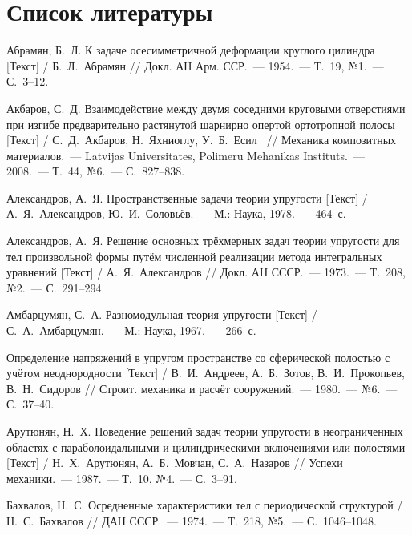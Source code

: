 
\setcounter{secnumdepth}{-1}
\chapter{Список литературы}
\setcounter{secnumdepth}{2}

\renewcommand{\bibliststyle}{\normalsize}
\renewcommand{\bibnumfmt}[1]{#1.\hfill}

\begin{biblist}{99}\setlength\itemsep{-8pt}

Абрамян, Б.~Л. 
К задаче осесимметричной деформации круглого цилиндра [Текст] 
/ Б.~Л.~Абрамян 
// Докл. АН Арм. ССР.~--- 1954.~--- Т.~19, №1.~--- С.~3--12.

Акбаров, С.~Д. 
Взаимодействие между двумя соседними круговыми отверстиями при изгибе предварительно растянутой шарнирно опертой ортотропной полосы [Текст] 
/ С.~Д.~Акбаров, Н.~Яхниоглу, У.~Б.~Есил~
// Механика композитных материалов.~--- Latvijas Universitates, Polimeru Mehanikas Instituts.~--- 2008.~--- Т.~44, №6.~--- С.~827--838.

Александров, А.~Я. 
Пространственные задачи теории упругости [Текст] 
/ А.~Я.~Александров, Ю.~И.~Соловьёв.~--- М.: Наука, 1978.~--- 464~с.

Александров, А.~Я. 
Решение основных трёхмерных задач теории упругости для тел произвольной формы путём численной реализации метода интегральных уравнений [Текст] / А.~Я.~Александров 
// Докл. АН СССР.~--- 1973.~--- Т.~208, №2.~--- С.~291--294.

Амбарцумян, С.~А. 
Разномодульная теория упругости [Текст] 
/ С.~А.~Амбарцумян.~--- М.: Наука, 1967.~--- 266~с.

Определение напряжений в упругом пространстве со сферической полостью с учётом неоднородности [Текст] 
/ В.~И.~Андреев, А.~Б.~Зотов, В.~И.~Прокопьев, В.~Н.~Сидоров 
// Строит. механика и расчёт сооружений.~--- 1980.~--- №6.~--- С.~37--40.

Арутюнян, Н.~Х. 
Поведение решений задач теории упругости в неограниченных областях с параболоидальными и цилиндрическими включениями или полостями [Текст] 
/ Н.~Х.~Арутюнян, А.~Б.~Мовчан, С.~А.~Назаров 
// Успехи механики.~--- 1987.~--- Т.~10, №4.~--- С.~3--91.

Бахвалов, Н.~С. 
Осредненные характеристики тел с периодической структурой  
/ Н.~С.~Бахвалов 
// ДАН СССР.~--- 1974.~--- Т.~218, №5.~--- С.~1046--1048.


\end{biblist}
